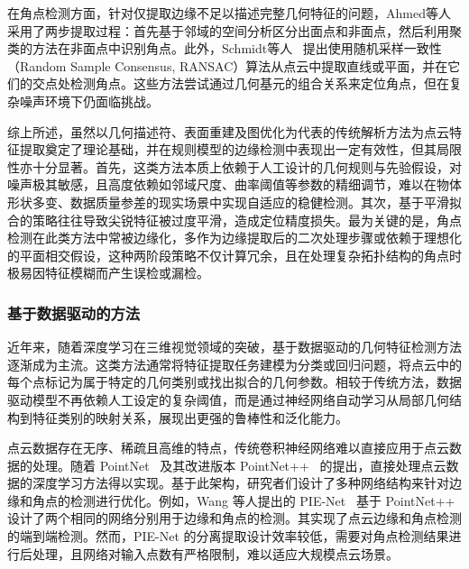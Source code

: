 在角点检测方面，针对仅提取边缘不足以描述完整几何特征的问题，Ahmed等人~\cite{ahmed_edge_2018} 采用了两步提取过程：首先基于邻域的空间分析区分出面点和非面点，然后利用聚类的方法在非面点中识别角点。此外，Schmidt等人~\cite{schmidt_detection_2023} 提出使用随机采样一致性（Random Sample Consensus, RANSAC）算法从点云中提取直线或平面，并在它们的交点处检测角点。这些方法尝试通过几何基元的组合关系来定位角点，但在复杂噪声环境下仍面临挑战。

综上所述，虽然以几何描述符、表面重建及图优化为代表的传统解析方法为点云特征提取奠定了理论基础，并在规则模型的边缘检测中表现出一定有效性，但其局限性亦十分显著。首先，这类方法本质上依赖于人工设计的几何规则与先验假设，对噪声极其敏感，且高度依赖如邻域尺度、曲率阈值等参数的精细调节，难以在物体形状多变、数据质量参差的现实场景中实现自适应的稳健检测。其次，基于平滑拟合的策略往往导致尖锐特征被过度平滑，造成定位精度损失。最为关键的是，角点检测在此类方法中常被边缘化，多作为边缘提取后的二次处理步骤或依赖于理想化的平面相交假设，这种两阶段策略不仅计算冗余，且在处理复杂拓扑结构的角点时极易因特征模糊而产生误检或漏检。

\subsubsection{基于数据驱动的方法}
近年来，随着深度学习在三维视觉领域的突破，基于数据驱动的几何特征检测方法逐渐成为主流。这类方法通常将特征提取任务建模为分类或回归问题，将点云中的每个点标记为属于特定的几何类别或找出拟合的几何参数。相较于传统方法，数据驱动模型不再依赖人工设定的复杂阈值，而是通过神经网络自动学习从局部几何结构到特征类别的映射关系，展现出更强的鲁棒性和泛化能力。

点云数据存在无序、稀疏且高维的特点，传统卷积神经网络难以直接应用于点云数据的处理。随着 PointNet~\cite{charles_pointnet_2017a} 及其改进版本 PointNet++~\cite{qi_pointnet_2017} 的提出，直接处理点云数据的深度学习方法得以实现。基于此架构，研究者们设计了多种网络结构来针对边缘和角点的检测进行优化。例如，Wang 等人提出的 PIE-Net~\cite{wang_pienet_2020} 基于 PointNet++ 设计了两个相同的网络分别用于边缘和角点的检测。其实现了点云边缘和角点检测的端到端检测。然而，PIE-Net 的分离提取设计效率较低，需要对角点检测结果进行后处理，且网络对输入点数有严格限制，难以适应大规模点云场景。

